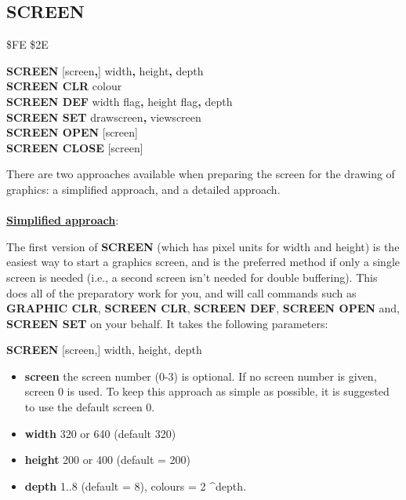 \subsection{SCREEN}
\begin{description}[leftmargin=2cm,style=nextline]
\item [Token:] \$FE \$2E
\item [Format:] {\bf SCREEN} [screen{\bf,}] width{\bf,} height{\bf,} depth \\
                {\bf SCREEN CLR} colour \\
                {\bf SCREEN DEF} width flag{\bf,} height flag{\bf,} depth \\
                {\bf SCREEN SET} drawscreen{\bf,} viewscreen \\
                {\bf SCREEN OPEN} [screen] \\
                {\bf SCREEN CLOSE} [screen]

\item [Usage:] There are two approaches available when preparing the screen for the
               drawing of graphics: a simplified approach, and a detailed approach.
\\
\\
    \underline{{\bf Simplified approach}}:

               The first version of {\bf SCREEN} (which has pixel
               units for width and height) is the easiest
               way to start a graphics screen, and is the preferred
               method if only a single screen is needed (i.e., a second screen
               isn't needed for double buffering). This does all of the
               preparatory work for you, and will call commands such as
               {\bf GRAPHIC CLR}, {\bf SCREEN CLR}, {\bf SCREEN DEF},
               {\bf SCREEN OPEN} and, {\bf SCREEN SET}
               on your behalf. It takes the following parameters:

               {\bf SCREEN} [screen,] width, height, depth

               \begin{itemize}
                \item {\bf screen} the screen number (0-3) is optional.
                If no screen number is given, screen 0 is used. To keep
                   this approach as simple as possible, it is suggested to
                   use the default screen 0.
                \item {\bf width} 320 or 640 (default 320)
                \item {\bf height} 200 or 400 (default = 200)
                \item {\bf depth} 1..8 (default = 8),
                   colours = 2 \textasciicircum depth.
               \end{itemize}


\end{description}
